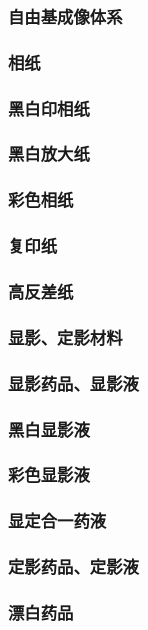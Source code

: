\documentclass[UTF8]{../../ApplicationUniverse}
\begin{document}
        \subsubsection{自由基成像体系}
        \subsubsection{相纸}
            \subsubsection{黑白印相纸}
            \subsubsection{黑白放大纸}
            \subsubsection{彩色相纸}
            \subsubsection{复印纸}
            \subsubsection{高反差纸}
    \subsubsection{显影、定影材料}
        \subsubsection{显影药品、显影液}
            \subsubsection{黑白显影液}
            \subsubsection{彩色显影液}
            \subsubsection{显定合一药液}
        \subsubsection{定影药品、定影液}
        \subsubsection{漂白药品}
\end{document}
